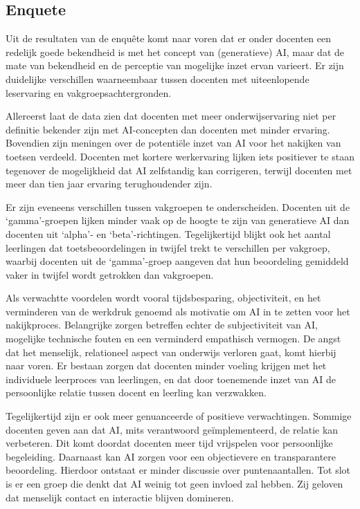 \documentclass[12pt]{article}
\begin{document}
\subsection{Enquete}
\begin{multicols}{2}
Uit de resultaten van de enquête komt naar voren dat er onder docenten een redelijk goede bekendheid is met het concept van (generatieve) AI, maar dat de mate van bekendheid en de perceptie van mogelijke inzet ervan varieert. Er zijn duidelijke verschillen waarneembaar tussen docenten met uiteenlopende leservaring en vakgroepsachtergronden. 

Allereerst laat de data zien dat docenten met meer onderwijservaring niet per definitie bekender zijn met AI-concepten dan docenten met minder ervaring. Bovendien zijn meningen over de potentiële inzet van AI voor het nakijken van toetsen verdeeld. Docenten met kortere werkervaring lijken iets positiever te staan tegenover de mogelijkheid dat AI zelfstandig kan corrigeren, terwijl docenten met meer dan tien jaar ervaring terughoudender zijn. 

Er zijn eveneens verschillen tussen vakgroepen te onderscheiden. Docenten uit de ‘gamma’-groepen lijken minder vaak op de hoogte te zijn van generatieve AI dan docenten uit ‘alpha’- en ‘beta’-richtingen. Tegelijkertijd blijkt ook het aantal leerlingen dat toetsbeoordelingen in twijfel trekt te verschillen per vakgroep, waarbij docenten uit de ‘gamma’-groep aangeven dat hun beoordeling gemiddeld vaker in twijfel wordt getrokken dan vakgroepen. 

Als verwachtte voordelen wordt vooral tijdsbesparing, objectiviteit, en het verminderen van de werkdruk genoemd als motivatie om AI in te zetten voor het nakijkproces. Belangrijke zorgen betreffen echter de subjectiviteit van AI, mogelijke technische fouten en een verminderd empathisch vermogen. De angst dat het menselijk, relationeel aspect van onderwijs verloren gaat, komt hierbij naar voren. Er bestaan zorgen dat docenten minder voeling krijgen met het individuele leerproces van leerlingen, en dat door toenemende inzet van AI de persoonlijke relatie tussen docent en leerling kan verzwakken. 

Tegelijkertijd zijn er ook meer genuanceerde of positieve verwachtingen. Sommige docenten geven aan dat AI, mits verantwoord geïmplementeerd, de relatie kan verbeteren. Dit komt doordat docenten meer tijd vrijspelen voor persoonlijke begeleiding. Daarnaast kan AI zorgen voor een objectievere en transparantere beoordeling. Hierdoor ontstaat er minder discussie over puntenaantallen. Tot slot is er een groep die denkt dat AI weinig tot geen invloed zal hebben. Zij geloven dat menselijk contact en interactie blijven domineren.


\end{multicols}
\end{document}
